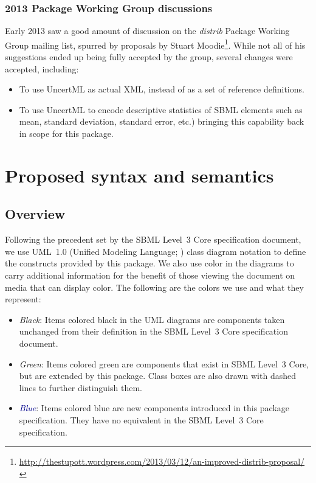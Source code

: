 \documentclass[draftspec]{sbmlpkgspec}
\newcommand{\distribshort}{\emph{distrib}\xspace}
\begin{document}
\subsubsection{2013 Package Working Group discussions}

Early 2013 saw a good amount of discussion on the \distribshort Package Working Group mailing list, spurred by proposals by Stuart Moodie\footnote{\url{http://thestupott.wordpress.com/2013/03/12/an-improved-distrib-proposal/}}.  While not all of his suggestions ended up being fully accepted by the group, several changes were accepted, including:

\begin{itemize}
\item To use UncertML as actual XML, instead of as a set of reference definitions.
\item To use UncertML to encode descriptive statistics of SBML elements such as mean, standard deviation, standard error, etc.) bringing this capability back in scope for this package.
\end{itemize}

\section{Proposed syntax and semantics}

\subsection{Overview}

Following the precedent set by the SBML Level~3 Core specification
document, we use UML~1.0 (Unified Modeling Language;
\citealt{eriksson:1998,oestereich:1999}) class diagram notation to
define the constructs provided by this package.  We also use color in
the diagrams to carry additional information for the benefit of those
viewing the document on media that can display color.  The following are
the colors we use and what they represent:

\begin{itemize}

\item[\raisebox{2.75pt}{\colorbox{black}{\rule{0.8pt}{0.8pt}}}]
  \emph{Black}: Items colored black in the UML diagrams are components
  taken unchanged from their definition in the SBML Level~3 Core
  specification document.

\item[\raisebox{2.75pt}{\colorbox{mediumgreen}{\rule{0.8pt}{0.8pt}}}]
  \emph{\textcolor{mediumgreen}{Green}}: Items colored green are
  components that exist in SBML Level~3 Core, but are extended by this
  package.  Class boxes are also drawn with dashed lines to further
  distinguish them.

\item[\raisebox{2.75pt}{\colorbox{darkblue}{\rule{0.8pt}{0.8pt}}}]
  \emph{\textcolor{darkblue}{Blue}}: Items colored blue are new
  components introduced in this package specification.  They have no
  equivalent in the SBML Level~3 Core specification.

\end{itemize}
\end{document}
